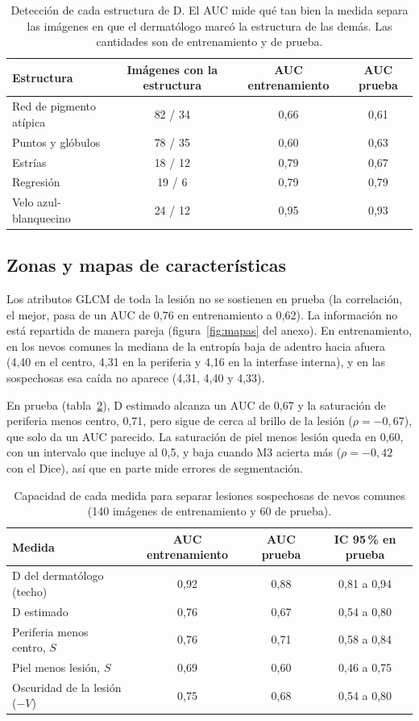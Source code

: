 \begin{table}[!htb]
  \centering\small
  \begin{tabular}{@{}lccc@{}}
    \toprule
    Estructura & Imágenes con la estructura & AUC entrenamiento & AUC prueba \\
    \midrule
    Red de pigmento atípica & 82 / 34 & 0,66 & 0,61 \\
    Puntos y glóbulos & 78 / 35 & 0,60 & 0,63 \\
    Estrías & 18 / 12 & 0,79 & 0,67 \\
    Regresión & 19 / 6 & 0,79 & 0,79 \\
    Velo azul-blanquecino & 24 / 12 & 0,95 & 0,93 \\
    \bottomrule
  \end{tabular}
  \caption{Detección de cada estructura de D. El AUC mide qué tan bien la medida separa las imágenes en que el dermatólogo marcó la estructura de las demás. Las cantidades son de entrenamiento y de prueba.}
  \label{tab:estructuras}
\end{table}

\subsection{Zonas y mapas de características}
Los atributos GLCM de toda la lesión no se sostienen en prueba (la correlación, el mejor, pasa de un AUC de 0,76 en entrenamiento a 0,62). La información no está repartida de manera pareja (figura~\ref{fig:mapas} del anexo). En entrenamiento, en los nevos comunes la mediana de la entropía baja de adentro hacia afuera (4,40 en el centro, 4,31 en la periferia y 4,16 en la interfase interna), y en las sospechosas esa caída no aparece (4,31, 4,40 y 4,33).

En prueba (tabla~\ref{tab:auc-prueba}), D estimado alcanza un AUC de 0,67 y la saturación de periferia menos centro, 0,71, pero sigue de cerca al brillo de la lesión ($\rho=-0{,}67$), que solo da un AUC parecido. La saturación de piel menos lesión queda en 0,60, con un intervalo que incluye al 0,5, y baja cuando M3 acierta más ($\rho=-0{,}42$ con el Dice), así que en parte mide errores de segmentación.

\begin{table}[!htb]
  \centering\small
  \begin{tabular}{@{}lccc@{}}
    \toprule
    Medida & AUC entrenamiento & AUC prueba & IC 95\,\% en prueba \\
    \midrule
    D del dermatólogo (techo) & 0,92 & 0,88 & 0,81 a 0,94 \\
    D estimado & 0,76 & 0,67 & 0,54 a 0,80 \\
    Periferia menos centro, $S$ & 0,76 & 0,71 & 0,58 a 0,84 \\
    Piel menos lesión, $S$ & 0,69 & 0,60 & 0,46 a 0,75 \\
    Oscuridad de la lesión ($-V$) & 0,75 & 0,68 & 0,54 a 0,80 \\
    \bottomrule
  \end{tabular}
  \caption{Capacidad de cada medida para separar lesiones sospechosas de nevos comunes (140 imágenes de entrenamiento y 60 de prueba).}
  \label{tab:auc-prueba}
\end{table}

